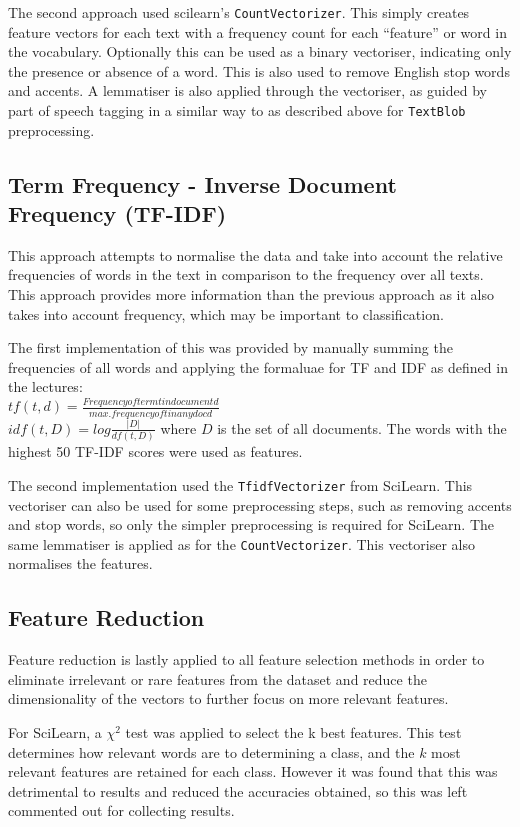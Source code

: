 \documentclass{article}
\begin{document}
The second approach used scilearn's \verb|CountVectorizer|. This simply creates feature vectors for each text with a frequency count for each ``feature'' or word in the vocabulary. Optionally this can be used as a binary vectoriser, indicating only the presence or absence of a word. This is also used to remove English stop words and accents. A lemmatiser is also applied through the vectoriser, as guided by part of speech tagging in a similar way to as described above for \verb|TextBlob| preprocessing.

\subsection{Term Frequency - Inverse Document Frequency (TF-IDF)}
This approach attempts to normalise the data and take into account the relative frequencies of words in the text in comparison to the frequency over all texts. This approach provides more information than the previous approach as it also takes into account frequency, which may be important to classification.

The first implementation of this was provided by manually summing the frequencies of all words and applying the formaluae for TF and IDF as defined in the lectures:
\\$tf(t, d) = \frac{Frequency of term t in document d}{max. frequency of t in any doc d}$
\\$idf(t, D) = log\frac{|D|}{df(t,D)}$ where $D$ is the set of all documents. The words with the highest 50 TF-IDF scores were used as features.

The second implementation used the \verb|TfidfVectorizer| from SciLearn. This vectoriser can also be used for some preprocessing steps, such as removing accents and stop words, so only the simpler preprocessing is required for SciLearn. The same lemmatiser is applied as for the \verb|CountVectorizer|. This vectoriser also normalises the features.

\subsection{Feature Reduction}
Feature reduction is lastly applied to all feature selection methods in order to eliminate irrelevant or rare features from the dataset and reduce the dimensionality of the vectors to further focus on more relevant features.

For SciLearn, a $\chi^2$ test was applied to select the k best features. This test determines how relevant words are to determining a class, and the $k$ most relevant features are retained for each class. However it was found that this was detrimental to results and reduced the accuracies obtained, so this was left commented out for collecting results.
\end{document}
